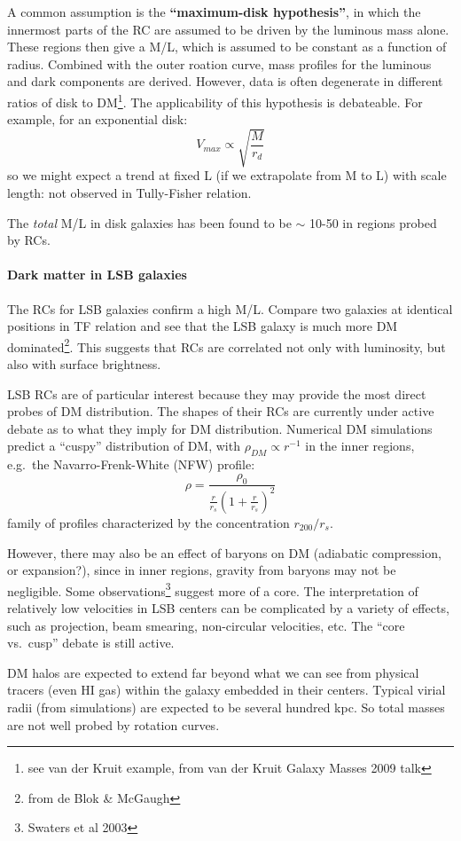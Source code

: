 \documentclass{article}
\begin{document}
A common assumption is the \textbf{``maximum-disk hypothesis''}, in which
the innermost parts of the RC are assumed to be driven by the luminous mass
alone. These regions then give a M/L, which is assumed to be constant as
a function of radius. Combined with the outer roation curve, mass profiles
for the luminous and dark components are derived. However, data is often
degenerate in different ratios of disk to DM\footnote{see van der Kruit
example, from van der Kruit Galaxy Masses 2009 talk}.
The applicability of this hypothesis is debateable. For example,
for an exponential disk:
\[
    V_{max} \propto \sqrt{\frac{M}{r_{d}}}
    \]
so we might expect a trend at fixed L (if we extrapolate from M to L)
with scale length: not observed in Tully-Fisher relation.

The \emph{total} M/L in disk galaxies
has been found to be $\sim$ 10-50 in regions probed by RCs.

\paragraph{Dark matter in LSB galaxies}
The RCs for LSB galaxies confirm a high M/L. Compare two galaxies at
identical positions in TF relation and see that the LSB galaxy is much
more DM dominated\footnote{from de Blok \& McGaugh}. This suggests that
RCs are correlated not only with luminosity, but also with surface
brightness.

LSB RCs are of particular interest because they may provide the most
direct probes of DM distribution. The shapes of their RCs are currently under
active debate as to what they imply for DM distribution.
Numerical DM simulations predict a ``cuspy'' distribution of DM,
with $\rho_{DM} \propto r^{-1}$ in the inner regions, e.g.\ the
Navarro-Frenk-White (NFW) profile:
\[
    \rho = \frac{\rho_{0}}{\frac{r}{r_{s}}\left(1+\frac{r}{r_{s}}\right)^{2}}
    \]
family of profiles characterized by the concentration $r_{200}/r_{s}$.

However, there may also be an effect of baryons on DM (adiabatic compression,
or expansion?), since in inner regions, gravity from baryons may not be
negligible. Some observations\footnote{Swaters et al 2003} suggest more of
a core. The interpretation of relatively low velocities in LSB centers can
be complicated by a variety of effects, such as projection, beam smearing,
non-circular velocities, etc. The ``core vs.\ cusp'' debate is still active.

DM halos are expected to extend far beyond what we can see from physical
tracers (even HI gas) within the galaxy embedded in their centers.
Typical virial radii (from simulations) are expected to be several hundred
kpc. So total masses are not well probed by rotation curves.
\end{document}
